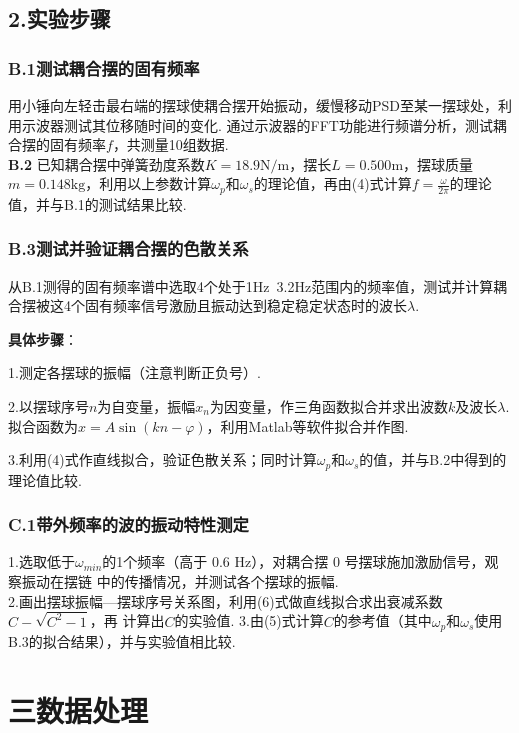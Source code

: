 \documentclass{ctexart}
\begin{document}
\subsection*{2.\quad 实验步骤}
\subsubsection*{B.1\quad 测试耦合摆的固有频率}
用小锤向左轻击最右端的摆球使耦合摆开始振动，缓慢移动PSD至某一摆球处，利用示波器测试其位移随时间的变化. 通过示波器的FFT功能进行频谱分析，测试耦合摆的固有频率$f$，共测量10组数据.\\

\noindent \textbf{B.2} 已知耦合摆中弹簧劲度系数$K=18.9\mathrm{N/m}$，摆长$L=0.500\mathrm{m}$，摆球质量$m=0.148\mathrm{kg}$，利用以上参数计算$\omega_p$和$\omega_s$的理论值，再由(4)式计算$f=\frac{\omega}{2\pi}$的理论值，并与B.1的测试结果比较.
\subsubsection*{B.3\quad 测试并验证耦合摆的色散关系}
从B.1测得的固有频率谱中选取4个处于1Hz~3.2Hz范围内的频率值，测试并计算耦合摆被这4个固有频率信号激励且振动达到稳定稳定状态时的波长$\lambda$.

\noindent \textbf{具体步骤}：

 1.测定各摆球的振幅（注意判断正负号）.

 2.以摆球序号$n$为自变量，振幅$x_n$为因变量，作三角函数拟合并求出波数$k$及波长$\lambda$. 拟合函数为$x=A\sin(kn-\varphi)$，利用Matlab等软件拟合并作图.

 3.利用(4)式作直线拟合，验证色散关系；同时计算$\omega_p$和$\omega_s$的值，并与B.2中得到的理论值比较.
\subsubsection*{C.1\quad 带外频率的波的振动特性测定}
\noindent 1.选取低于$\omega_{min}$的1个频率（高于 0.6 Hz），对耦合摆 0 号摆球施加激励信号，观察振动在摆链
中的传播情况，并测试各个摆球的振幅.\\
\noindent 2.画出摆球振幅—摆球序号关系图，利用(6)式做直线拟合求出衰减系数$C-\sqrt{C^2-1}$，再
计算出$C$的实验值.
\noindent 3.由(5)式计算$C$的参考值（其中$\omega_p$和$\omega_s$使用 B.3的拟合结果），并与实验值相比较.

\clearpage
\section*{三\quad 数据处理}
\end{document}
